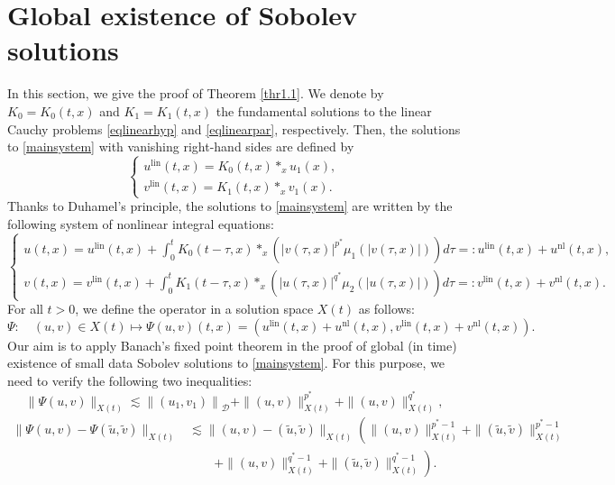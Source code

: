 \documentclass[11pt,reqno]{amsart}
\numberwithin{equation}{section}
\begin{document}
\section{Global existence of Sobolev solutions}
In this section, we give the proof of Theorem \ref{thr1.1}. We denote by $K_0=K_0(t,x)$ and $K_1=K_1(t,x)$ the fundamental solutions to the linear Cauchy problems \eqref{eqlinearhyp} and \eqref{eqlinearpar}, respectively. Then, the solutions to \eqref{mainsystem} with vanishing right-hand sides are defined by
$$
\left\{\begin{array}{l}
u^{\mathrm{lin}}(t,x)=K_0(t,x) *_x u_1(x), \\
v^{\mathrm{lin} }(t,x)=K_1(t,x) *_x v_1(x) .
\end{array}\right.
$$
Thanks to Duhamel's principle, the solutions to \eqref{mainsystem} are written by the following system of nonlinear integral equations:
\[
\left\{
\begin{aligned}
u(t,x)=u^{\mathrm{lin}}(t,x)+\int_0^t K_0(t-\tau,x) *_x\left(|v(\tau,x)|^{p^*} \mu_1(|v(\tau,x)|)\right) d \tau=: u^{\mathrm{lin}}(t,x)+u^{\mathrm{nl}}(t,x), \\
v(t,x)=v^{\mathrm{lin}}(t,x)+\int_0^t K_1(t-\tau,x) *_x\left(|u(\tau,x)|^{q^*} \mu_2(|u(\tau,x)|)\right) d \tau=: v^{\mathrm{lin} }(t,x)+v^{\mathrm{nl}}(t,x) .
\end{aligned}
\right.
\]
For all $t>0$, we define the operator in a solution space $X(t)$ as follows:
$$
\Psi: \quad(u, v) \in X(t) \mapsto \Psi(u, v)(t,x)=\left(u^{\mathrm{lin} }(t,x)+u^{\mathrm{nl}}(t,x), v^{\mathrm{lin} }(t,x)+v^{\mathrm{nl}}(t,x)\right) .
$$
Our aim is to apply Banach's fixed point theorem in the proof of global (in time) existence of small data Sobolev solutions to \eqref{mainsystem}. For this purpose, we need to verify the following two inequalities:
\begin{equation}\label{eqbanachfixedpoint1}
    \|\Psi(u, v)\|_{X(t)} \lesssim\left\|\left(u_1,v_1\right)\right\|_{\mathcal{D}}+\|(u, v)\|_{X(t)}^{p^*}+\|(u, v)\|_{X(t)}^{q^*},
\end{equation}
\begin{equation}\label{eqbanachfixedpoint2}
\begin{aligned}
\|\Psi(u, v)-\Psi(\tilde{u}, \tilde{v})\|_{X(t)} &\lesssim\|(u, v)-(\tilde{u}, \tilde{v})\|_{X(t)}\left(\|(u, v)\|_{X(t)}^{p^*-1}+\|(\tilde{u}, \tilde{v})\|_{X(t)}^{p^*-1}\right. \\
&\qquad\left.+\|(u, v)\|_{X(t)}^{q^*-1}+\|(\tilde{u}, \tilde{v})\|_{X(t)}^{q^*-1}\right).
\end{aligned}
\end{equation}
 
\end{document}
